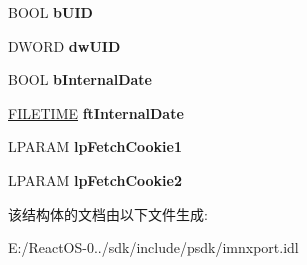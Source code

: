 \begin{DoxyCompactItemize}
B\+O\+OL {\bfseries b\+U\+ID}
\item 
\mbox{\label{struct_i_i_m_a_p_callback_1_1tag_f_e_t_c_h___c_m_d___r_e_s_u_l_t_s_a0bf5073582e840d12d707d18474226f1}} 
D\+W\+O\+RD {\bfseries dw\+U\+ID}
\item 
\mbox{\label{struct_i_i_m_a_p_callback_1_1tag_f_e_t_c_h___c_m_d___r_e_s_u_l_t_s_a81e3849521699563e995c1e197017663}} 
B\+O\+OL {\bfseries b\+Internal\+Date}
\item 
\mbox{\label{struct_i_i_m_a_p_callback_1_1tag_f_e_t_c_h___c_m_d___r_e_s_u_l_t_s_a1e79bc89e3e1eac1be14864b7f0e728b}} 
\hyperlink{struct___f_i_l_e_t_i_m_e}{F\+I\+L\+E\+T\+I\+ME} {\bfseries ft\+Internal\+Date}
\item 
\mbox{\label{struct_i_i_m_a_p_callback_1_1tag_f_e_t_c_h___c_m_d___r_e_s_u_l_t_s_a5c29333c31b150d0370d2c1543557cd8}} 
L\+P\+A\+R\+AM {\bfseries lp\+Fetch\+Cookie1}
\item 
\mbox{\label{struct_i_i_m_a_p_callback_1_1tag_f_e_t_c_h___c_m_d___r_e_s_u_l_t_s_a44c69bf05440823f1805cbfd2469633d}} 
L\+P\+A\+R\+AM {\bfseries lp\+Fetch\+Cookie2}
\end{DoxyCompactItemize}


该结构体的文档由以下文件生成\+:\begin{DoxyCompactItemize}
\item 
E\+:/\+React\+O\+S-\/0../sdk/include/psdk/imnxport.\+idl\end{DoxyCompactItemize}
